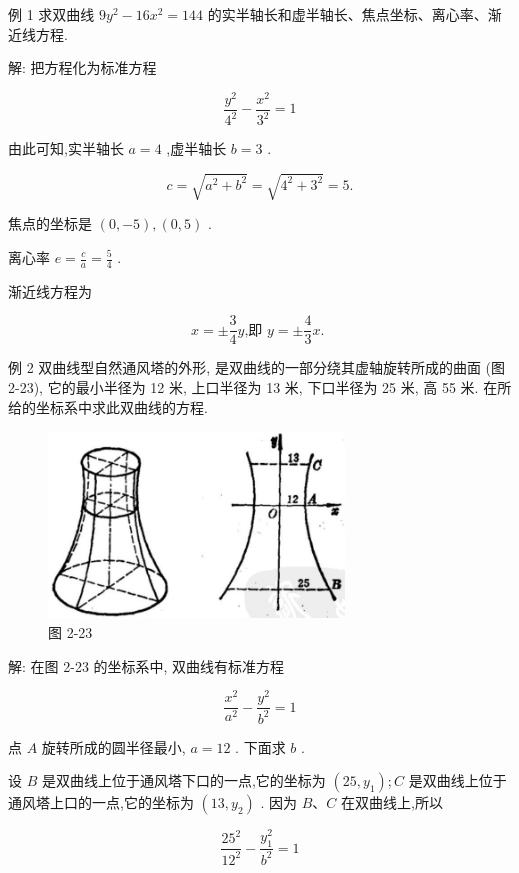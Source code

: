 \documentclass[lang=cn,newtx,10.5pt,scheme=chinese]{elegantbook}
\begin{document}
例 1 求双曲线 \(9{y}^{2} - {16}{x}^{2} = {144}\) 的实半轴长和虚半轴长、焦点坐标、离心率、渐近线方程.

解: 把方程化为标准方程

\[
  \frac{{y}^{2}}{{4}^{2}} - \frac{{x}^{2}}{{3}^{2}} = 1
\]

由此可知,实半轴长 \(a = 4\) ,虚半轴长 \(b = 3\) .

\[
  c = \sqrt{{a}^{2} + {b}^{2}} = \sqrt{{4}^{2} + {3}^{2}} = 5.
\]

焦点的坐标是 \(\left( {0, - 5}\right) ,\left( {0,5}\right)\) .

离心率 \(e = \frac{c}{a} = \frac{5}{4}\) .

渐近线方程为

\[
  x = \pm \frac{3}{4}y\text{,即 }y = \pm \frac{4}{3}x\text{. }
\]

例 2 双曲线型自然通风塔的外形, 是双曲线的一部分绕其虚轴旋转所成的曲面 (图 2-23), 它的最小半径为 12 米, 上口半径为 13 米, 下口半径为 25 米, 高 55 米. 在所给的坐标系中求此双曲线的方程.

\begin{figure}[h]
  \centering
  \includegraphics[max width=0.7\textwidth]{images/01912cc2-ffb6-728e-9ae7-b113ff05c64b_102_919231.jpg}
  \caption{图 2-23}
\end{figure}



解: 在图 2-23 的坐标系中, 双曲线有标准方程

\[
  \frac{{x}^{2}}{{a}^{2}} - \frac{{y}^{2}}{{b}^{2}} = 1
\]

点 \(A\) 旋转所成的圆半径最小, \(a = {12}\) . 下面求 \(b\) .

设 \(B\) 是双曲线上位于通风塔下口的一点,它的坐标为 \(\left( {{25},{y}_{1}}\right) ;C\) 是双曲线上位于通风塔上口的一点,它的坐标为 \(\left( {{13},{y}_{2}}\right)\) . 因为 \(B\text{、}C\) 在双曲线上,所以

\[
  \frac{{25}^{2}}{{12}^{2}} - \frac{{y}_{1}^{2}}{{b}^{2}} = 1
\]
\end{document}
